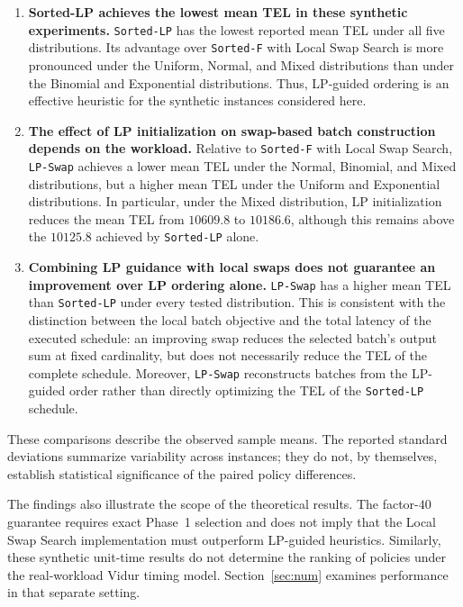 \documentclass[nonblindrev]{informs3_hide}
\newcommand{\sortF}{\texttt{Sorted-F}}
\newcommand{\sortLP}{\texttt{Sorted-LP}}
\newcommand{\LPSwap}{\texttt{LP-Swap}}
\begin{document}
\begin{enumerate}
    \item \textbf{Sorted-LP achieves the lowest mean TEL in
    these synthetic experiments.}
    \sortLP{} has the lowest reported mean TEL under all five
    distributions. Its advantage over \sortF{} with Local Swap
    Search is more pronounced under the Uniform, Normal, and
    Mixed distributions than under the Binomial and Exponential
    distributions. Thus, LP-guided ordering is an effective
    heuristic for the synthetic instances considered here.

    \item \textbf{The effect of LP initialization on swap-based
    batch construction depends on the workload.}
    Relative to \sortF{} with Local Swap Search, \LPSwap{}
    achieves a lower mean TEL under the Normal, Binomial, and
    Mixed distributions, but a higher mean TEL under the Uniform
    and Exponential distributions. In particular, under the Mixed
    distribution, LP initialization reduces the mean TEL from
    $10609.8$ to $10186.6$, although this remains above the
    $10125.8$ achieved by \sortLP{} alone.

    \item \textbf{Combining LP guidance with local swaps does not
    guarantee an improvement over LP ordering alone.}
    \LPSwap{} has a higher mean TEL than \sortLP{} under every
    tested distribution. This is consistent with the distinction
    between the local batch objective and the total latency of
    the executed schedule: an improving swap reduces the
    selected batch's output sum at fixed cardinality, but does
    not necessarily reduce the TEL of the complete schedule.
    Moreover, \LPSwap{} reconstructs batches from the LP-guided
    order rather than directly optimizing the TEL of the
    \sortLP{} schedule.
\end{enumerate}

These comparisons describe the observed sample means.
The reported standard deviations summarize variability across
instances; they do not, by themselves, establish statistical
significance of the paired policy differences.

The findings also illustrate the scope of the theoretical results.
The factor-$40$ guarantee requires exact Phase~1 selection and
does not imply that the Local Swap Search implementation must
outperform LP-guided heuristics. Similarly, these synthetic
unit-time results do not determine the ranking of policies under
the real-workload Vidur timing model. Section~\ref{sec:num}
examines performance in that separate setting.
\end{document}
